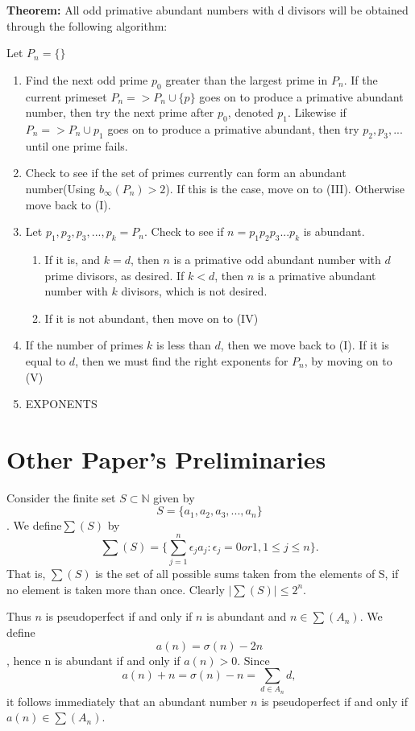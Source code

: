 \documentclass[]{article}
\begin{document}
\textbf{Theorem:} All odd primative abundant numbers with d divisors will be obtained through the following algorithm:

Let $P_n = \{\}$ 


\begin{enumerate}[label=(\Roman*)]
\item Find the next odd prime $p_0$ greater than the largest prime in $P_n$. If the current primeset $P_n => P_n \cup \{p\}$ goes on to produce a primative abundant number, then try the next prime after $p_0$, denoted $p_1$. Likewise if $P_n => P_n \cup p_1$ goes on to produce a primative abundant, then try $p_2, p_3, ... $ until one prime fails. 


\item Check to see if the set of primes currently can form an abundant number(Using $b_{\infty} (P_n) > 2$). If this is the case, move on to (III). Otherwise move back to (I).

\item Let ${p_1, p_2, p_3, ... , p_k} = P_n$. Check to see if $n = p_1 p_2 p_3 ... p_k$ is abundant. 

\begin{enumerate}[label=(\roman*)]
  \item If it is, and $k = d$, then $n$ is a primative odd abundant number with $d$ prime divisors, as desired. If $k < d$, then $n$ is a primative abundant number with $k$ divisors, which is not desired.
  \item If it is not abundant, then move on to (IV) 
\end{enumerate}


\item If the number of primes $k$ is less than $d$, then we move back to (I). If it is equal to $d$, then we must find the right exponents for $P_n$, by moving on to (V) 
\item EXPONENTS

\end{enumerate}




\section{Other Paper's Preliminaries}

Consider the finite set $S \subset \mathbb{N}$ given by
$$S = \{a_1,a_2,a_3,...,a_n\}$$.
We define$\sum(S)$ by
$$\sum(S) = \{\sum_{j=1}^n \epsilon_j a_j : \epsilon_j = 0 or 1, 1 \leq j \leq n \}.$$
That is, $\sum(S)$ is the set of all possible sums taken from the elements of S, if no element is taken more than once. Clearly $|\sum (S)| \leq 2^n$.

Thus $n$ is pseudoperfect if and only if $n$ is abundant and $n \in \sum (\textit{A}_n)$. We define
$$a(n) = \sigma(n) - 2n$$,
hence n is abundant if and only if $a(n) > 0$. Since
$$a(n) + n = \sigma (n) - n = \sum_{d\in \textit{A}_n}d,$$
it follows immediately that an abundant number $n$ is pseudoperfect if and only if $a(n) \in \sum(\textit{A}_n)$. 
\end{document}
